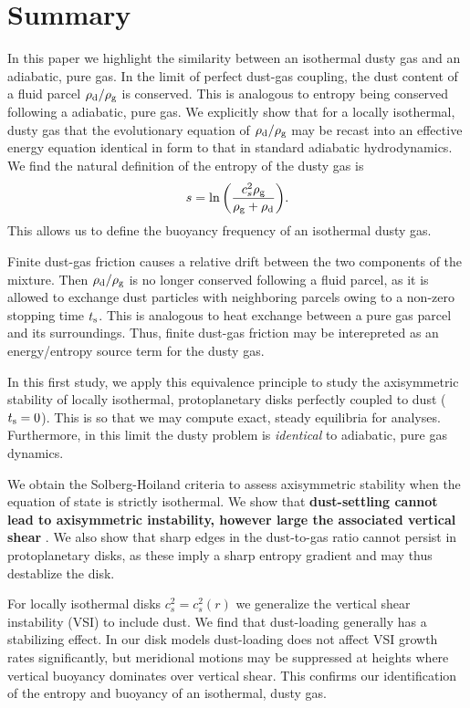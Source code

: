 \section{Summary}\label{summary}
In this paper we highlight the similarity between an isothermal 
dusty gas and an adiabatic, pure gas. 
In the limit of perfect dust-gas coupling, the dust content of a fluid 
parcel $\rho_\mathrm{d}/\rho_\mathrm{g}$ is conserved. This is analogous to entropy being 
conserved following a adiabatic, pure gas. %
We explicitly show that for 
a locally isothermal, dusty gas that the evolutionary equation of 
$\rho_\mathrm{d}/\rho_\mathrm{g}$ may be recast into an effective energy equation identical
in form to that in standard adiabatic hydrodynamics. We find the 
natural definition of the entropy of the dusty gas is 
\begin{align*}
  s  = \ln{\left(\frac{c_s^2\rho_\mathrm{g}}{\rho_\mathrm{g}+\rho_\mathrm{d}}\right)}.  
\end{align*}
This allows us to define the buoyancy frequency of an isothermal 
dusty gas. 

%

Finite dust-gas friction causes a relative drift between the two
components of the mixture. Then $\rho_\mathrm{d}/\rho_\mathrm{g} $ is no
longer conserved following a fluid parcel, as it is allowed to
exchange dust particles with neighboring parcels owing to a non-zero
stopping time $t_\mathrm{s}$. This is analogous to heat exchange between a 
pure gas parcel and its surroundings. Thus, finite dust-gas friction
may be interepreted as an energy/entropy source term for the dusty
gas.   

%
In this first study, we apply this equivalence principle to study the
axisymmetric stability of locally isothermal, protoplanetary disks
perfectly coupled to dust ($t_\mathrm{s}=0$). This is so that we may 
compute exact, steady equilibria for analyses. Furthermore,
in this limit the dusty problem is \emph{identical} to adiabatic, pure
gas dynamics. 

We obtain the Solberg-Hoiland criteria to assess
axisymmetric stability when the equation of state is strictly
isothermal. We show that {\bf dust-settling cannot lead to
  axisymmetric instability, however large the associated vertical
  shear} \citep[cf. \emph{non-axisymmetric} Kelvin-Helmholtz instabilities
  induced by  dust-settling, ][]{lee10}. We also show that
sharp edges in the dust-to-gas ratio cannot persist in protoplanetary
disks, as these imply a sharp entropy gradient and may thus destablize
the disk. 


For locally isothermal disks $c^2_s=c_s^2(r)$ we generalize the vertical
shear instability (VSI) to include dust. We find that dust-loading
generally has a stabilizing effect. In our disk models
dust-loading does not affect VSI growth rates significantly, but
meridional motions may be suppressed at heights where vertical 
buoyancy dominates over vertical shear. This confirms our 
identification of the entropy and buoyancy of an isothermal, dusty
gas. 
